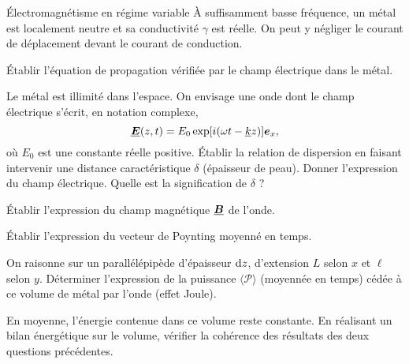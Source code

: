 \begin{td}{Électromagnétisme en régime variable}
	À suffisamment basse fréquence, un métal est localement neutre et sa
	conductivité $\gamma$ est réelle. On peut y négliger le courant de 
	déplacement devant le courant de conduction.
	\begin{exlist}
		\item Établir l'équation de propagation vérifiée par le champ
		 électrique dans le métal.
		\item Le métal est illimité dans l'espace. On envisage une 
		  onde dont le champ électrique s'écrit, en notation complexe, 
		  \begin{equation}
			  \complex{\vece}(z, t) = E_0 \exp[i(\omega t - \complex{k}z)]\ex,
		 \end{equation}
		 où $E_0$ est une constante réelle positive. Établir la relation
		 de dispersion en faisant intervenir une distance caractéristique 
		 $\delta$ (épaisseur de peau). Donner l'expression du champ 
		 électrique. Quelle est la signification de $\delta$ ?
	 \item Établir l'expression du champ magnétique $\complex{\vecb}$ de l'onde. 
		\item Établir l'expression du vecteur de Poynting moyenné en temps.
		\item On raisonne sur un parallélépipède d'épaisseur
		  $\mathrm{d}z$, d'extension $L$ selon $x$ et $\ell$ selon $y$. Déterminer
		  l'expression de la puissance $\langle \mathcal{P} \rangle$ 
		  (moyennée en temps)
		  cédée à ce volume de métal par l'onde (effet Joule).
		\item En moyenne, l'énergie contenue dans ce volume reste constante.
		  En réalisant un bilan énergétique sur le volume, vérifier 
		  la cohérence des résultats des deux questions précédentes.
	\end{exlist}
\end{td}
